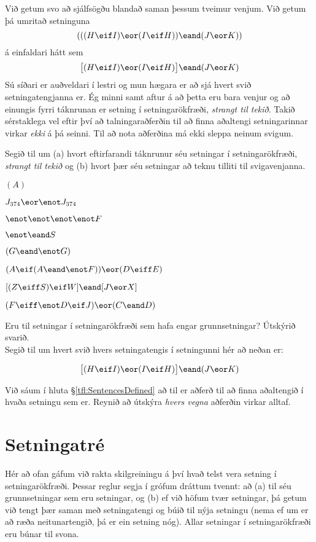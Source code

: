 Við getum svo að sjálfsögðu blandað saman þessum tveimur venjum. Við getum þá umritað setninguna $$(((H \eif I) \eor (I \eif H)) \eand (J \eor K))$$ á einfaldari hátt sem $$\bigl[(H \eif I) \eor (I \eif H)\bigr] \eand (J \eor K)$$ Sú síðari er auðveldari í lestri og mun hægara er að sjá hvert svið setningatengjanna er. Ég minni samt aftur á að þetta eru bara venjur og að einungis fyrri táknrunan er setning í setningarökfræði, \emph{strangt til tekið}. Takið sérstaklega vel eftir því að talningaraðferðin til að finna aðaltengi setningarinnar virkar \emph{ekki} á þá seinni. Til að nota aðferðina má ekki sleppa neinum svigum.

\practiceproblems
\problempart
\label{pr.wiffTFL}
Segið til um (a) hvort eftirfarandi táknrunur séu setningar í setningarökfræði, \emph{strangt til tekið} og (b) hvort þær séu setningar að teknu tilliti til svigavenjanna.

\begin{earg}
\item $(A)$
\item $J_{374} \eor \enot J_{374}$
\item $\enot \enot \enot \enot F$
\item $\enot \eand S$
\item $(G \eand \enot G)$
\item $(A \eif (A \eand \enot F)) \eor (D \eiff E)$
\item $[(Z \eiff S) \eif W] \eand [J \eor X]$
\item $(F \eiff \enot D \eif J) \eor (C \eand D)$
\end{earg}

\problempart
Eru til setningar í setningarökfræði sem hafa engar grunnsetningar? Útskýrið svarið.\\

\problempart
Segið til um hvert svið hvers setningatengis í setningunni hér að neðan er:

$$\bigl[(H \eif I) \eor (I \eif H)\bigr] \eand (J \eor K)$$

\problempart
Við sáum í hluta \S\ref{tfl:SentencesDefined} að til er aðferð til að finna aðaltengið í hvaða setningu sem er. Reynið að útskýra \emph{hvers vegna} aðferðin virkar alltaf.

\chapter{Setningatré}

Hér að ofan gáfum við rakta skilgreiningu á því hvað telst vera setning í setningarökfræði. Þessar reglur segja í grófum dráttum tvennt: að (a) til séu grunnsetningar sem eru setningar, og (b) ef við höfum tvær setningar, þá getum við tengt þær saman með setningatengi og búið til nýja setningu (nema ef um er að ræða neitunartengið, þá er ein setning nóg). Allar setningar í setningarökfræði eru búnar til svona.

